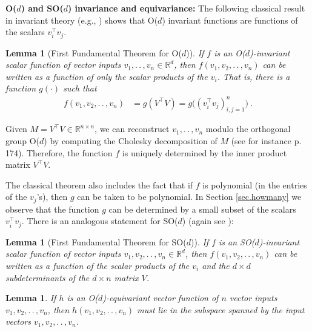 \documentclass{article}
\makeatletter
\renewcommand{\paragraph}[1]{\par\textbf{#1}}
\theoremstyle{Hogg}
\newtheorem{lemma}[theorem]{Lemma}
\renewenvironment{proof}[1][\proofname]{\par
  \vspace{-\topsep}%
  \pushQED{\qed}%
  \normalfont
  \topsep0pt \partopsep0pt %
  \trivlist
  \item[\hskip\labelsep
        \itshape
    #1\@addpunct{.}]\ignorespaces
}{%
  \popQED\endtrivlist\@endpefalse
  \addvspace{0pt plus 0pt} %
}
\renewcommand{\ldots}{.\,.\,}
\renewcommand{\cdots}{\ldots}
\makeatother
\begin{document}
\paragraph{O($d$) and SO($d$) invariance and equivariance:}
The following classical result in invariant theory (e.g., \cite[Section~II.A.9]{weyl}) shows that O($d$) invariant functions are functions of the scalars $v_i^\top v_j$. 
\begin{lemma}[First Fundamental Theorem for O($d$)]\label{lemma:1}
If $f$ is an O($d$)-invariant scalar function of vector inputs $v_1,\ldots, v_n \in \mathbb R^d$, then $f(v_1,v_2, \ldots, v_n)$ can be written as a function of only the scalar products of the $v_i$.
That is, there is a function $g(\cdot)$ such that
\begin{align}
    f(v_1,v_2, \ldots, v_n) &= g(V^\top V) = g\big((v_i^\top v_j)_{i,j=1}^n\big)
    ~. \label{eq.invariant}
\end{align}
\end{lemma}

\begin{proof}
Given $M=V^\top V \in \mathbb R^{n\times n}$, we can reconstruct $v_1,\ldots, v_n$ modulo the orthogonal group O($d$) by computing the Cholesky decomposition of $M$ (see for instance \cite{trefethen1997numerical} p. 174). Therefore, the function $f$ is uniquely determined by the inner product matrix $V^\top V$.
\end{proof}
 
The classical theorem also includes the fact that if $f$ is polynomial (in the entries of the $v_j$'s), then $g$ can be taken to be polynomial. In Section \ref{sec.howmany} we observe that the function $g$ can be determined by a small subset of the scalars $v_i^\top v_j$.  There is an analogous statement for SO($d$) (again see  \cite[Section~II.A.9]{weyl}):

\begin{lemma}[First Fundamental Theorem for SO($d$)] \label{lem.sodinvars}
If $f$ is an SO($d$)-invariant scalar function of vector inputs $v_1,v_2,\ldots,v_n\in\mathbb R^d$, then $f(v_1,v_2,\ldots, v_n)$ can be written as a function of the scalar products of the $v_i$ and the $d\times d$ subdeterminants of the $d\times n$ matrix $V$.
\end{lemma}

\begin{lemma} \label{lemma.span}
If $h$ is an O($d$)-equivariant vector function of $n$ vector inputs $v_1,v_2, \cdots, v_n$, then $h(v_1,v_2,  \cdots, v_n)$ must lie in the subspace spanned by the input vectors $v_1,v_2, \cdots, v_n$. 
\end{lemma}
\end{document}
